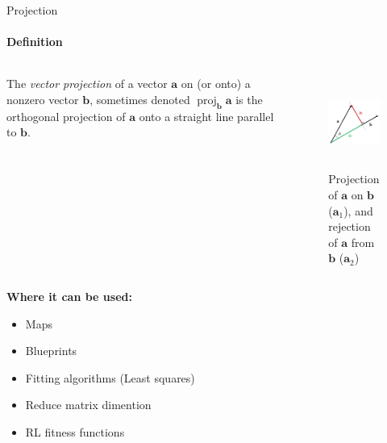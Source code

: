 \documentclass[aspectratio=169]{beamer}
\begin{document}
\begin{frame}[t]{Projection}
\framesubtitle{Definition}
\vspace{-0.3cm}
\begin{columns}[T,onlytextwidth]
    \begin{column}{0.5\textwidth}
        The \textit{vector projection} of a vector $\mathbf {a}$ on (or onto) a nonzero vector $\mathbf {b}$, sometimes denoted $\operatorname {proj} _{\mathbf {b} }\mathbf {a}$  is the orthogonal projection of $\mathbf {a}$ onto a straight line parallel to $\mathbf {b}$.
    \end{column}
    \begin{column}{0.49\textwidth}
        \vspace{-1cm}
        \begin{figure}[H]
            \centering\includegraphics[height=3cm,width=1\textwidth,keepaspectratio]{Projection_and_rejection.png}
            \caption*{Projection of $\mathbf{a}$ on $\mathbf{b}$ ($\mathbf{a}_1$), and rejection of $\mathbf{a}$ from $\mathbf{b}$ ($\mathbf{a}_2$)}
            \label{fig:Projection_and_rejection.png}
        \end{figure}
    \end{column}
\end{columns}
\textbf{Where it can be used:}
\vspace{-0.5cm}
\begin{multicols}{2}
    \begin{itemize}
        \item Maps
        \item Blueprints
        \item Fitting algorithms (Least squares)
        \item Reduce matrix dimention
        \item RL fitness functions
    \end{itemize}
\end{multicols}
\end{frame}
\end{document}
